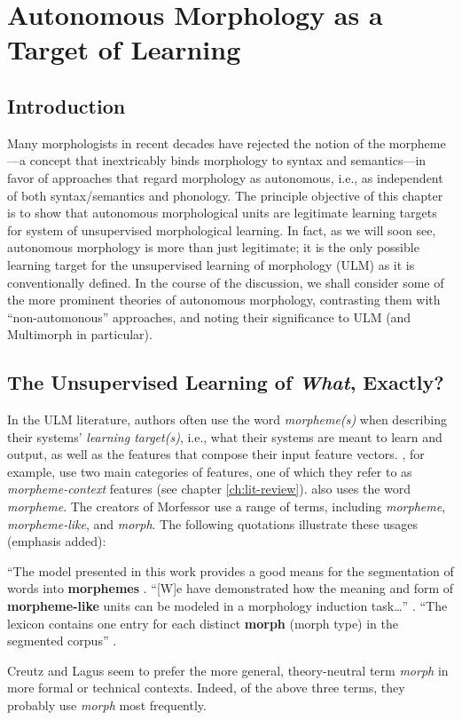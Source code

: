 \chapter{Autonomous Morphology as a Target of Learning}
\label{autonomous}

\section{Introduction}
Many morphologists in recent decades have rejected the notion of the morpheme---a concept that inextricably binds morphology to syntax and semantics---in favor of approaches that regard morphology as autonomous, i.e., as independent 
of both syntax/semantics and phonology. The principle objective of this chapter is to 
show that autonomous morphological units are legitimate learning targets for system of unsupervised morphological learning. In fact, as we will soon see, autonomous morphology is more than just legitimate; it is the only possible learning target for the unsupervised learning of morphology (ULM) as it is conventionally defined.
In the course of the discussion, we shall consider some of the more prominent theories of autonomous morphology, contrasting them with ``non-automonous'' approaches, and  noting their significance to ULM (and Multimorph in particular).


\section{The Unsupervised Learning of \textit{What}, Exactly?}
\label{sec:what-exactly}
In the ULM literature, authors often use the word \emph{morpheme(s)} 
when describing their systems' \emph{learning target(s)}, i.e., what their systems are meant to learn and 
output, as well as the features that compose their input feature vectors.
\cite{poon-et-al:2009}, for example, use two main categories 
of features, one of which they refer to as \emph{morpheme-context} features (see chapter \ref{ch:lit-review}).
\cite{goldsmith:2001, goldsmith:2006} also uses the word 
\emph{morpheme}.
The creators of Morfessor 
\citep{creutz-and-lagus:2002, 
creutz-and-lagus:2005, creutz-and-lagus:2007}
use a range of terms, including 
\emph{morpheme},
\emph{morpheme-like}, and \emph{morph}. The following quotations 
illustrate these usages (emphasis added):
\begin{exe}
\ex ``The model presented in this 
work provides a good means for the segmentation of words into 
\textbf{morphemes} \citep[][p. 6]{creutz-and-lagus:2007}. 
\ex``[W]e have demonstrated how the meaning and form of 
\textbf{morpheme-like} units can be modeled in a 
morphology induction task\dots'' \citep{creutz-and-lagus:2005}.
\ex``The lexicon contains one entry for each distinct \textbf{morph} 
(morph type) in the 
segmented corpus'' \citep[][p. 9]{creutz-and-lagus:2007}. 
\end{exe}
Creutz and Lagus seem to prefer the more general, theory-neutral term \emph{morph} 
in more formal or technical contexts. Indeed,
of the above three terms, they probably use 
\emph{morph} most frequently.

